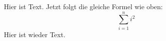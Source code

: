 Hier ist Text. Jetzt folgt
die gleiche Formel wie oben:
\[ \sum_{i=1}^{n}i^2 \]
Hier ist wieder Text.